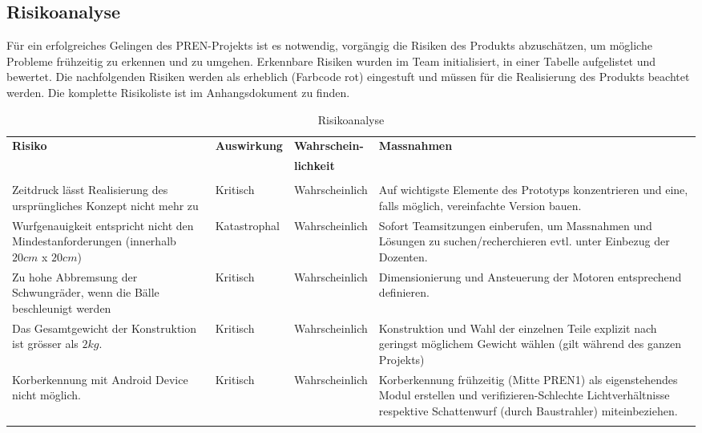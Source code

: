 \subsection{Risikoanalyse}
Für ein erfolgreiches Gelingen des PREN-Projekts ist es notwendig, vorgängig die 
Risiken des Produkts abzuschätzen, um mögliche Probleme frühzeitig zu erkennen 
und zu umgehen. Erkennbare Risiken wurden im Team initialisiert, in einer Tabelle 
aufgelistet und bewertet. Die nachfolgenden Risiken werden als erheblich 
(Farbcode rot) eingestuft und müssen für die Realisierung des Produkts beachtet 
werden. Die komplette Risikoliste ist im Anhangsdokument zu finden.
%
 \begin{longtable}{p{4cm}l l p{5.5cm}}
 	\textbf{Risiko} & \textbf{Auswirkung} & \textbf{Wahrschein-} & \textbf{Massnahmen} \\
 	                &                     & \textbf{lichkeit}    & \\	     
 	\hline & & & \\
 	\endhead
	\rule{0pt}{12pt}Zeitdruck lässt Realisierung des ursprüngliches Konzept nicht mehr zu &
	Kritisch & Wahrscheinlich & Auf wichtigste Elemente des Prototyps konzentrieren und eine, 
	falls möglich, vereinfachte Version bauen. \\
	
	\rule{0pt}{12pt}Wurfgenauigkeit entspricht nicht den Mindestanforderungen 
	(innerhalb $20 cm$ x $20 cm$) & Katastrophal & Wahrscheinlich & Sofort Teamsitzungen 
	einberufen, um Massnahmen und Lösungen zu suchen/recherchieren evtl. unter Einbezug der 
	Dozenten.\\
	
	\rule{0pt}{12pt}Zu hohe Abbremsung der Schwungräder, wenn die Bälle beschleunigt werden & 
	Kritisch & Wahrscheinlich & Dimensionierung und Ansteuerung der Motoren entsprechend 
	definieren.\\
	
	\rule{0pt}{12pt}Das Gesamtgewicht der Konstruktion ist grösser als $2 kg$. & Kritisch & 
	Wahrscheinlich & Konstruktion und Wahl der einzelnen Teile explizit nach geringst 
	möglichem Gewicht wählen (gilt während des ganzen Projekts)\\
	
	\rule{0pt}{12pt}Korberkennung mit Android Device nicht möglich. & Kritisch & Wahrscheinlich &
	 Korberkennung frühzeitig (Mitte PREN1) als eigenstehendes Modul erstellen und 
	 verifizieren-Schlechte Lichtverhältnisse respektive Schattenwurf (durch Baustrahler) 
	 miteinbeziehen.\\
 	\caption{Risikoanalyse}
 	\label{tab:RikisoanalyseTabelle}
 \end{longtable}

